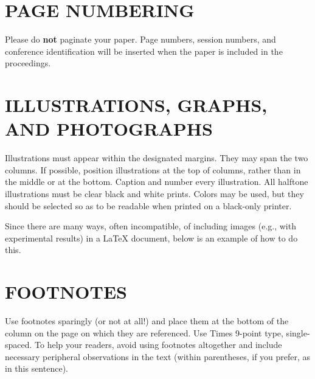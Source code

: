 \documentclass{article}
\begin{document}
\section{PAGE NUMBERING}
\label{sec:page}

Please do {\bf not} paginate your paper.  Page numbers, session numbers, and
conference identification will be inserted when the paper is included in the
proceedings.

\section{ILLUSTRATIONS, GRAPHS, AND PHOTOGRAPHS}
\label{sec:illust}

Illustrations must appear within the designated margins.  They may span the two
columns.  If possible, position illustrations at the top of columns, rather
than in the middle or at the bottom.  Caption and number every illustration.
All halftone illustrations must be clear black and white prints.  Colors may be
used, but they should be selected so as to be readable when printed on a
black-only printer.

Since there are many ways, often incompatible, of including images (e.g., with
experimental results) in a LaTeX document, below is an example of how to do
this.

\section{FOOTNOTES}
\label{sec:foot}

Use footnotes sparingly (or not at all!) and place them at the bottom of the
column on the page on which they are referenced. Use Times 9-point type,
single-spaced. To help your readers, avoid using footnotes altogether and
include necessary peripheral observations in the text (within parentheses, if
you prefer, as in this sentence).
\end{document}
